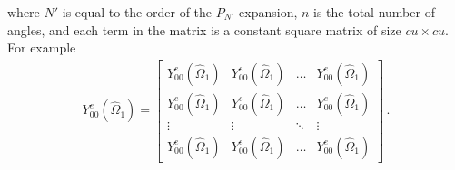 \documentclass[10pt]{article}
\begin{document}
where $N'$ is equal to the order of the $P_{N'}$ expansion, $n$ is the total number of angles, and each term in the matrix is a constant square matrix of size $cu \times cu$. For example
%
\begin{align*}
Y_{00}^e(\hat{\Omega}_1)  = 
\begin{bmatrix}
   Y_{00}^e(\hat{\Omega}_1) & Y_{00}^e(\hat{\Omega}_1)  & \dots & Y_{00}^e(\hat{\Omega}_1) \\
   Y_{00}^e(\hat{\Omega}_1) & Y_{00}^e(\hat{\Omega}_1)  & \dots & Y_{00}^e(\hat{\Omega}_1) \\
   \vdots & \vdots & \ddots & \vdots \\
   Y_{00}^e(\hat{\Omega}_1) & Y_{00}^e(\hat{\Omega}_1)  & \dots & Y_{00}^e(\hat{\Omega}_1)
\end{bmatrix}\,.
\end{align*}
\end{document}
